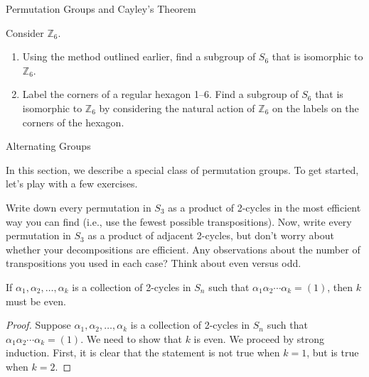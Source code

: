 \begin{section}{Permutation Groups and Cayley's Theorem}
\begin{problem}
Consider $\mathbb{Z}_6$.
\begin{enumerate}[label=\textrm{(\alph*)}]
\item Using the method outlined earlier, find a subgroup of $S_6$ that is isomorphic to $\mathbb{Z}_6$.
\item Label the corners of a regular hexagon 1--6. Find a subgroup of $S_6$ that is isomorphic to $\mathbb{Z}_6$ by considering the natural action of $\mathbb{Z}_6$ on the labels on the corners of the hexagon.
\end{enumerate}
\end{problem}

\end{section}

\begin{section}{Alternating Groups}

In this section, we describe a special class of permutation groups.  To get started, let's play with a few exercises.

\begin{problem}
Write down every permutation in $S_3$ as a product of 2-cycles in the most efficient way you can find (i.e., use the fewest possible transpositions).  Now, write every permutation in $S_3$ as a product of adjacent 2-cycles, but don't worry about whether your decompositions are efficient.  Any observations about the number of transpositions you used in each case?  Think about even versus odd.
\end{problem}

\begin{theorem}
If $\alpha_1,\alpha_2,\ldots,\alpha_k$ is a collection of 2-cycles in $S_n$ such that $\alpha_1\alpha_2\cdots\alpha_k=(1)$, then $k$ must be even.
\end{theorem}

\begin{proof}
Suppose $\alpha_1,\alpha_2,\ldots,\alpha_k$ is a collection of 2-cycles in $S_n$ such that $\alpha_1\alpha_2\cdots\alpha_k=(1)$.  We need to show that $k$ is even. We proceed by strong induction. First, it is clear that the statement is not true when $k=1$, but is true when $k=2$. 


\end{proof}
\end{section}
